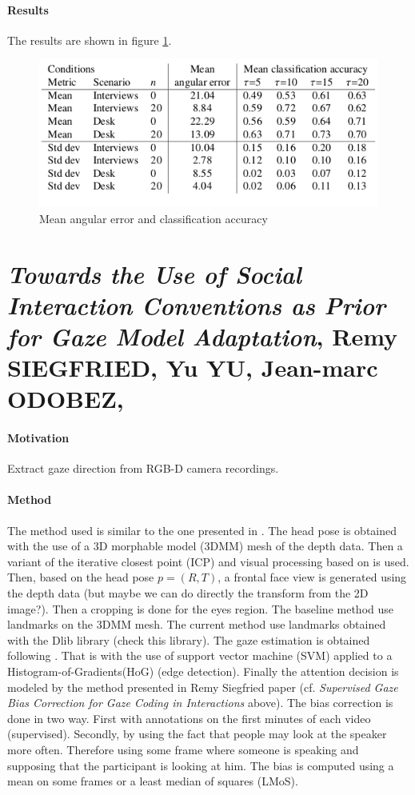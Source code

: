 \documentclass[11pt,a4paper]{article}
\begin{document}
\paragraph{Results}
The results are shown in figure \ref{ResultsRemy}.
\begin{figure}[!h]
\centering
\includegraphics[scale=0.7]{./Pictures/ResultsRemy.png}
\caption{Mean angular error and classification accuracy \label{ResultsRemy}}
\end{figure}

\section{\textit{Towards the Use of Social Interaction Conventions as Prior for Gaze Model Adaptation}, Remy SIEGFRIED, Yu YU, Jean-marc ODOBEZ, \cite{Siegfried2017}}

\paragraph{Motivation}
Extract gaze direction from RGB-D camera recordings.

\paragraph{Method}
The method used is similar to the one presented in \cite{Funes2016}. The head pose is obtained with the use of a 3D morphable model (3DMM) mesh of the depth data. Then a variant of the iterative closest point (ICP) and visual processing based on \cite{Yu2017} is used. Then, based on the head pose $p=(R,T)$, a frontal face view is generated using the depth data (but maybe we can do directly the transform from the 2D image?). Then a cropping is done for the eyes region. The baseline method use landmarks on the 3DMM mesh. The current method use landmarks obtained with the Dlib library (check this library). The gaze estimation is obtained following \cite{Funes2016}. That is with the use of support vector machine (SVM) applied to a Histogram-of-Gradients(HoG) (edge detection). Finally the attention decision is modeled by the method presented in Remy Siegfried paper (cf. \textit{Supervised Gaze Bias Correction for Gaze Coding in Interactions} above). The bias correction is done in two way. First with annotations on the first minutes of each video (supervised). Secondly, by using the fact that people may look at the speaker more often. Therefore using some frame where someone is speaking and supposing that the participant is looking at him. The bias is computed using a mean on some frames or a least median of squares (LMoS). 
\end{document}
